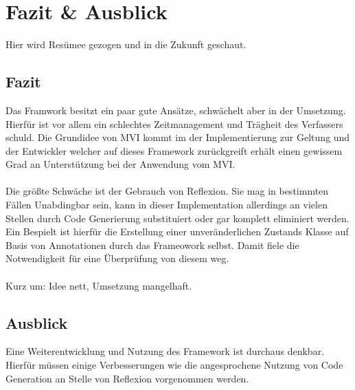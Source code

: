 \section{Fazit \& Ausblick}
Hier wird Resümee gezogen und in die Zukunft geschaut.

\subsection{Fazit}
Das Framwork besitzt ein paar gute Ansätze, schwächelt aber in der Umsetzung. Hierfür ist vor allem ein schlechtes Zeitmanagement und Trägheit des Verfassers schuld. Die Grundidee von MVI kommt im der Implementierung zur Geltung und der Entwickler welcher auf dieses Framework zurückgreift erhält einen gewissem Grad an Unterstützung bei der Anwendung vom MVI.
\\\\
Die größte Schwäche ist der Gebrauch von Reflexion. Sie mag in bestimmten Fällen Unabdingbar sein, kann in dieser Implementation allerdings an vielen Stellen durch Code Generierung substituiert oder gar komplett eliminiert werden. Ein Bespielt ist hierfür die Erstellung einer unveränderlichen Zustands Klasse auf Basis von Annotationen durch das Frameowork selbst. Damit fiele die Notwendigkeit für eine Überprüfung von diesem weg.
\\\\
Kurz um: Idee nett, Umsetzung mangelhaft.

\subsection{Ausblick}
Eine Weiterentwicklung und Nutzung des Framework ist durchaus denkbar. Hierfür müssen einige Verbesserungen wie die angesprochene Nutzung von Code Generation an Stelle von Reflexion vorgenommen werden. 